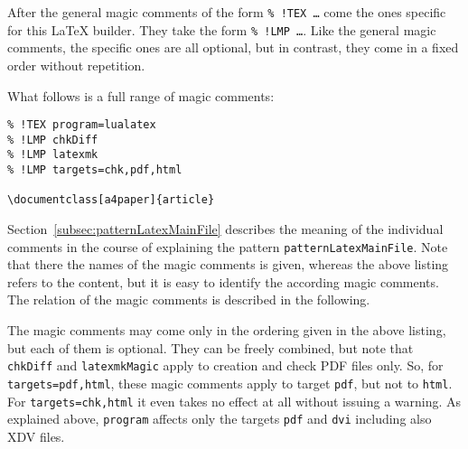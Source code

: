 After the general magic comments of the form \texttt{\%~!TEX \dots} 
come the ones specific for this \LaTeX{} builder. 
They take the form \texttt{\%~!LMP \dots}. 
Like the general magic comments, the specific ones are all optional, 
but in contrast, they come in a fixed order without repetition. 

What follows is a full range of magic comments: 
%
\begin{Verbatim}
% !TEX program=lualatex
% !LMP chkDiff
% !LMP latexmk
% !LMP targets=chk,pdf,html

\documentclass[a4paper]{article}
\end{Verbatim}


Section~\ref{subsec:patternLatexMainFile} 
describes the meaning of the individual comments 
in the course of explaining the pattern \texttt{patternLatexMainFile}. 
Note that there the names of the magic comments is given, whereas the above listing refers to the content, 
but it is easy to identify the according magic comments. 
The relation of the magic comments is described in the following. 

The magic comments may come only in the ordering given in the above listing, 
but each of them is optional. 
They can be freely combined, 
but note that \texttt{chkDiff} and \texttt{latexmkMagic} 
apply to creation and check PDF files only. 
So, for \texttt{targets=pdf,html}, these magic comments apply to target \texttt{pdf}, 
but not to \texttt{html}. 
For \texttt{targets=chk,html} it even takes no effect at all 
without issuing a warning. 
As explained above, \texttt{program} affects 
only the targets \texttt{pdf} and \texttt{dvi} including also XDV files. 







